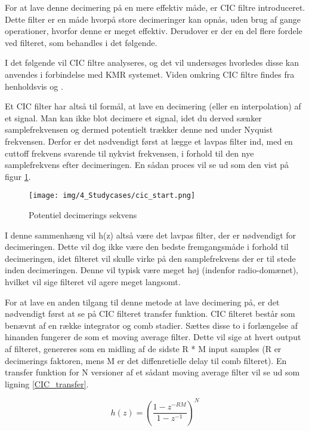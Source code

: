\begin{appendices}
For at lave denne decimering på en mere effektiv måde, er CIC filtre introduceret. Dette filter er en måde hvorpå store decimeringer kan opnås, uden brug af gange operationer, hvorfor denne er meget effektiv. Derudover er der en del flere fordele ved filteret, som behandles i det følgende. 

I det følgende vil CIC filtre analyseres, og det vil undersøges hvorledes disse kan anvendes i forbindelse med KMR systemet. Viden omkring CIC filtre findes fra henholdsvis \cite{CIC-compensation} og \cite{CIC-filters}.

Et CIC filter har altså til formål, at lave en decimering (eller en interpolation) af et signal. Man kan ikke blot decimere et signal, idet du derved sænker samplefrekvensen og dermed potentielt trækker denne ned under Nyquist frekvensen. Derfor er det nødvendigt først at lægge et lavpas filter ind, med en cuttoff frekvens svarende til nykvist frekvensen, i forhold til den nye samplefrekvens efter decimeringen. En sådan proces vil se ud som den vist på figur \ref{fig:cic_decimering}.

\begin{figure}[H]
	\centering{}
	\texttt{[image: img/4\_Studycases/cic\_start.png]}
	\caption{Potentiel decimerings sekvens}
	\label{fig:cic_decimering}
\end{figure} 

I denne sammenhæng vil h(z) altså være det lavpas filter, der er nødvendigt for decimeringen. Dette vil dog ikke være den bedste fremgangsmåde i forhold til decimeringen, idet filteret vil skulle virke på den samplefrekvens der er til stede inden decimeringen. Denne vil typisk være meget høj (indenfor radio-domænet), hvilket vil sige filteret vil agere meget langsomt. 

For at lave en anden tilgang til denne metode at lave decimering på, er det nødvendigt først at se på CIC filteret transfer funktion. CIC filteret består som benævnt af en række integrator og comb stadier. Sættes disse to i forlængelse af hinanden fungerer de som et moving average filter. Dette vil sige at hvert output af filteret, genereres som en midling af de sidste R * M input samples (R er decimerings faktoren, mens M er det diffenretielle delay til comb filteret). En transfer funktion for N versioner af et sådant moving average filter vil se ud som ligning \ref{CIC_transfer}.   

\begin{equation} \label{CIC_transfer}
h(z) = (\frac{1 - z^{-RM}}{1 - z^{-1}})^N
\end{equation}


\end{appendices}
